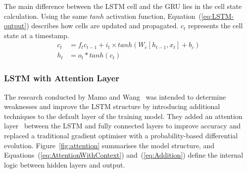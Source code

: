 The main difference between the LSTM cell and the GRU lies in the cell state calculation.
Using the same $tanh$ activation function, \mbox{Equation~(\ref{eq:LSTM-output})} describes how cells are updated and propagated.
$c_t$ represents the cell state at a timestamp.
\begin{equation}
    \begin{split}
        c_t &= f_t c_{t-1}+i_t \times tanh \left( W_c \left[h_{t-1}, x_t \right] + b_c \right) \\
        h_t &= o_t*tanh \left( c_t \right)
    \end{split}
    \label{eq:LSTM-output}
\end{equation}   

%
\subsubsection{LSTM with Attention Layer}
The research conducted by Mamo and Wang~\cite{mamo_long_2020} was intended to determine weaknesses and improve the LSTM structure by introducing additional techniques to the default layer of the training model.
They added an attention layer~\cite{yang_hierarchical_2016} between the LSTM and fully connected layers to improve accuracy and replaced a traditional gradient optimiser with a probability-based differential evolution.
\mbox{Figure~\ref{fig:attention}} summarises the model structure, and \mbox{Equations~(\ref{eq:AttentionWithContext})} and~(\ref{eq:Addition}) define the internal logic between hidden layers and output.

